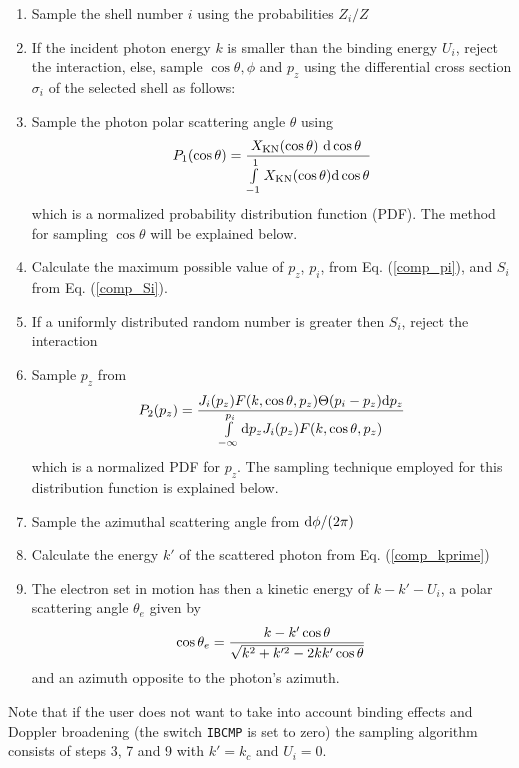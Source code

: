 \begin{enumerate}
\item
Sample the shell number $i$ using the probabilities $Z_i/Z$
\item
If the incident photon energy $k$ is smaller than the binding 
energy $U_i$, reject the interaction, 
else, sample $\cos \theta, \phi$ and $p_z$ using the differential 
cross section $\sigma_i$ of the selected shell as follows:
\item
Sample the photon polar scattering angle $\theta$ using 
\begin{displaymath}
P_1(\cos \theta) = 
{X_{\rm KN}(\cos \theta)~{\rm d} \cos \theta~ \over 
\int\limits_{-1}^1 X_{\rm KN}(\cos \theta) {\rm d} \cos \theta }
\end{displaymath}
which is a normalized probability distribution function (PDF). The method 
for sampling $\cos \theta$ will be explained below.
\item
Calculate the maximum possible value of $p_z$, $p_i$, from 
Eq. (\ref{comp_pi}), and $S_i$ from Eq. (\ref{comp_Si}).
\item
If a uniformly distributed random number is greater then $S_i$, 
reject the interaction
\item
Sample $p_z$ from 
\begin{displaymath}
P_2(p_z) = 
{ J_i(p_z) F(k,\cos \theta,p_z) \Theta(p_i - p_z) {\rm d} p_z \over 
\int\limits_{-\infty}^{p_i} {\rm d} p_z J_i(p_z) F(k,\cos \theta,p_z) }
\end{displaymath}
which is a normalized PDF for $p_z$. The sampling 
technique employed for this distribution function is explained below.
\item
Sample the azimuthal scattering angle from ${\rm d}\phi/(2 \pi)$
\item
Calculate the energy $k'$ of the scattered photon from 
Eq. (\ref{comp_kprime})
\item
The electron set in motion has then a kinetic energy of $k - k' - U_i$, 
a polar scattering angle $\theta_e$ given by 
\begin{equation}
\cos \theta_e = {k - k' \cos \theta \over 
\sqrt{k^2 + k^{\prime 2} - 2 k k' \cos \theta} }
\end{equation}
and an azimuth opposite to the photon's azimuth.
\end{enumerate}
Note that if the user does not want to take into account binding 
effects and Doppler broadening (the switch {\tt IBCMP} is set to zero)
the sampling algorithm consists of steps 3, 7 and 9 with 
$k' = k_c$ and $U_i = 0$. 

